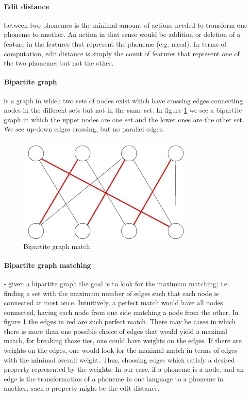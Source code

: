 \documentclass[letterpaper, 11pt]{article}
\begin{document}
\paragraph{Edit distance} between two phonemes is the minimal amount of actions needed to transform one phoneme to another. An action in that sense would be addition or deletion of a feature in the features that represent the phoneme (e.g. nasal). In terms of computation, edit distance is simply the count of features that represent one of the two phonemes but not the other.

\paragraph{Bipartite graph} is a graph in which two sets of nodes exist which have crossing edges connecting nodes in the different sets but not in the same set. In figure \ref{fig:bipartite} we see a bipartite graph in which the upper nodes are one set and the lower ones are the other set. We see up-down edges crossing, but no parallel edges.

\begin{figure}
	\includegraphics[width=0.8\columnwidth, angle=90]{Matching_pic_3_1_and_3_2}
	\caption{Bipartite graph match
		\label{fig:bipartite}
	}
\end{figure}

\paragraph{Bipartite graph matching} - given a bipartite graph the goal is to look for the maximum matching; i.e. finding a set with the maximum number of edges such that each node is connected at most once. Intuitively, a perfect match would have all nodes connected, having each node from one side matching a node from the other. In figure \ref{fig:bipartite} the edges in {\color{red} red} are such perfect match.
There may be cases in which there is more than one possible choice of edges that would yield a maximal match, for breaking those ties, one could have weights on the edges. If there are weights on the edges, one would look for the maximal match in terms of edges with the minimal overall weight. Thus, choosing edges which satisfy a desired property represented by the weights. In our case, if a phoneme is a node, and an edge is the transformation of a phoneme in one language to a phoneme in another, such a property might be the edit distance.
\end{document}
